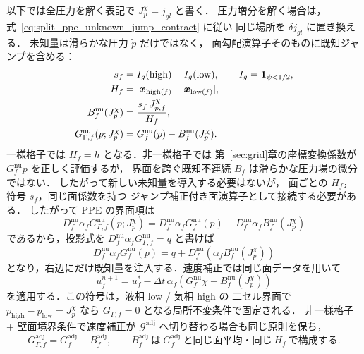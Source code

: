 以下では全圧力を解く表記で $J_p^\chi=j_{gl}$ と書く．
圧力増分を解く場合は，式~\eqref{eq:split_ppe_unknown_jump_contract} に従い
同じ場所を $\delta j_{gl}$ に置き換える．
未知量は滑らかな圧力 $\tilde p$ だけではなく，
面勾配演算子そのものに既知ジャンプを含める：
\begin{align}
  s_f &= I_g(\mathrm{high})-I_g(\mathrm{low}),\qquad
        I_g=\mathbf{1}_{\psi<1/2}, \\
  H_f &= |\bm{x}_{\mathrm{high}(f)}-\bm{x}_{\mathrm{low}(f)}|, \\
  B_f^{\mathrm{nu}}(J_p^\chi) &= \frac{s_f\,J_{p,f}^\chi}{H_f}, \\
  G_{\Gamma,f}^{\mathrm{nu}}(p;J_p^\chi)
    &= G_f^{\mathrm{nu}}(p)-B_f^{\mathrm{nu}}(J_p^\chi).
  \label{eq:split_ppe_pressure_composition}
\end{align}
一様格子では $H_f=h$ となる．非一様格子では
第~\ref{sec:grid}章の座標変換係数が $G_f^{\mathrm{nu}}p$ を正しく評価するが，
界面を跨ぐ既知不連続 $B_f$ は滑らかな圧力場の微分ではない．
したがって新しい未知量を導入する必要はないが，
面ごとの $H_f$，符号 $s_f$，同じ面係数を持つ
ジャンプ補正付き面演算子として接続する必要がある．
したがって PPE の界面項は
\begin{equation}
  D_f^{\mathrm{nu}}\alpha_fG_{\Gamma,f}^{\mathrm{nu}}(p;J_p^\chi)
  =D_f^{\mathrm{nu}}\alpha_fG_f^{\mathrm{nu}}(p)
   -D_f^{\mathrm{nu}}\alpha_fB_f^{\mathrm{nu}}(J_p^\chi)
  \label{eq:split_ppe_affine_rhs}
\end{equation}
であるから，投影式を
$D_f^{\mathrm{nu}}\alpha_fG_{\Gamma,f}^{\mathrm{nu}}=q$ と書けば
\[
  D_f^{\mathrm{nu}}\alpha_fG_f^{\mathrm{nu}}(p)
  =
  q+D_f^{\mathrm{nu}}\!\left(\alpha_fB_f^{\mathrm{nu}}(J_p^\chi)\right)
\]
となり，右辺にだけ既知量を注入する．速度補正では同じ面データを用いて
\begin{equation}
  u_f^{n+1}
  =
  u_f^\ast
  -\Delta t\,\alpha_f
  \left(G_f^{\mathrm{nu}}\chi-B_f^{\mathrm{nu}}(J_p^\chi)\right)
  \label{eq:split_ppe_affine_corrector}
\end{equation}
を適用する．この符号は，液相 low / 気相 high の
二セル界面で $p_\mathrm{high}-p_\mathrm{low}=J_p^\chi$ なら
$G_{\Gamma,f}=0$ となる局所不変条件で固定される．
非一様格子 + 壁面境界条件で速度補正が
$\mathcal{G}^\text{adj}$ へ切り替わる場合も同じ原則を保ち，
\begin{equation}
  G_{\Gamma,f}^{\mathrm{adj}}
  =
  G_f^{\mathrm{adj}}-B_f^{\mathrm{adj}},
  \qquad
  B_f^{\mathrm{adj}}\ \text{は}\ G_f^{\mathrm{adj}}\ \text{と同じ面平均・同じ}\ H_f\ \text{で構成する}.
  \label{eq:split_ppe_affine_adj}
\end{equation}
